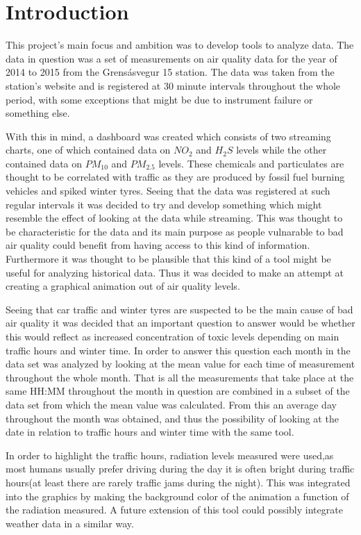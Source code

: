 \documentclass[12pt, a4paper]{article}
\begin{document}
\section{Introduction}
This project's main focus and ambition was to develop tools to analyze data. The data in question was a set of measurements on air quality data for the year of 2014 to 2015 from the Grensásvegur 15 station.
The data was taken from the station's website and is registered at 30 minute intervals throughout the whole period, with some exceptions that might be due to instrument failure or something else.


With this in mind, a dashboard was created which consists of two streaming charts, one of which contained data on \(NO_2\) and \(H_2S\) levels while the other contained data on \(PM_{10}\) and \(PM_{2.5}\) levels.
These chemicals and particulates are thought to be correlated with traffic as they are produced by fossil fuel burning vehicles and spiked winter tyres. 
Seeing that the data was registered at such regular intervals it was decided to try and develop something which might resemble the effect of looking at the data while streaming. 
This was thought to be characteristic for the data and its main purpose as people vulnarable to bad air quality could benefit from having access to this kind of information.
Furthermore it was thought to be plausible that this kind of a tool might be useful for analyzing historical data.
Thus it was decided to make an attempt at creating a graphical animation out of air quality levels.  


Seeing that car traffic and winter tyres are suspected to be the main cause of bad air quality it was decided that an important question to answer would be whether this would reflect 
as increased concentration of toxic levels depending on main traffic hours and winter time.
In order to answer this question each month in the data set was analyzed by looking at the mean value for each time of measurement throughout the whole month. 
That is all the measurements that take place at the same HH:MM throughout the month in question are combined in a subset of the data set from which the 
mean value was calculated. From this an average day throughout the month was obtained, and thus the possibility of looking at the date in relation to traffic hours and winter time with the same tool.


In order to highlight the traffic hours, radiation levels measured were used,as most humans usually prefer driving during the day it is often bright during traffic hours(at least there are rarely traffic jams during the night).
This was integrated into the graphics by making the background color of the animation a function of the radiation measured. A future extension of this tool could possibly integrate weather data in a similar way.
\end{document}
